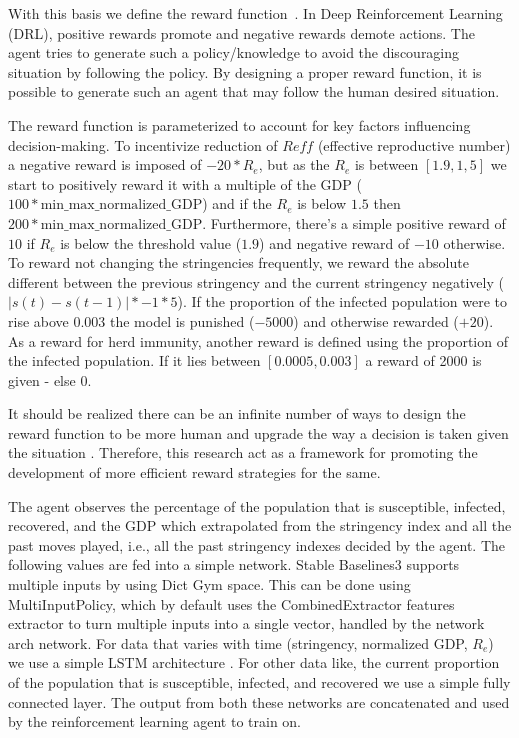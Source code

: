 \documentclass[tikz,fleqn,12pt]{wlscirep}
\begin{document}
With this basis we define the reward function~\cite{Ohi2020}. In Deep Reinforcement Learning (DRL), positive rewards promote and negative rewards demote actions. The agent tries to generate such a policy/knowledge to avoid the discouraging situation by following the policy. By designing a proper reward function, it is possible to generate such an agent that may follow the human desired situation.


The reward function is parameterized to account for key factors influencing decision-making. To incentivize reduction of $R{eff}$ (effective reproductive number) a negative reward is imposed of $-20 * R_e$, but as the $R_e$ is between $[1.9, 1,5]$ we start to positively reward it with a multiple of the GDP ($100 * \textrm{min\_max\_normalized\_GDP}$) and if the $R_e$ is below $1.5$ then $200 * \textrm{min\_max\_normalized\_GDP}$. Furthermore, there's a simple positive reward of $10$ if $R_e$ is below the threshold value ($1.9$) and negative reward of $-10$ otherwise. To reward not changing the stringencies frequently, we reward the absolute different between the previous stringency and the current stringency negatively ($|s(t) - s(t-1)| * -1 * 5$). If the proportion of the infected population were to rise above 0.003 the model is punished ($-5000$) and otherwise rewarded ($+20$). As a reward for herd immunity, another reward is defined using the proportion of the infected population. If it lies between $[0.0005, 0.003]$ a reward of 2000 is given - else $0$.

It should be realized there can be an infinite number of ways to design the reward function to be more human and upgrade the way a decision is taken given the situation \cite{AWSDeepRacer}. Therefore, this research act as a  framework for promoting the development of more efficient reward strategies for the same. 

The agent observes the percentage of the population that is susceptible, infected, recovered, and the GDP which extrapolated from the stringency index and all the past moves played, i.e., all the past stringency indexes decided by the agent. The following values are fed into a simple network. Stable Baselines3 supports multiple inputs by using Dict Gym space. This can be done using MultiInputPolicy, which by default uses the CombinedExtractor features extractor to turn multiple inputs into a single vector, handled by the network arch network. For data that varies with time (stringency, normalized GDP, $R_e$) we use a simple LSTM architecture \cite{LSTM}. For other data like, the current proportion of the population that is susceptible, infected, and recovered we use a simple fully connected layer. The output from both these networks are concatenated and used by the reinforcement learning agent to train on.
\end{document}

